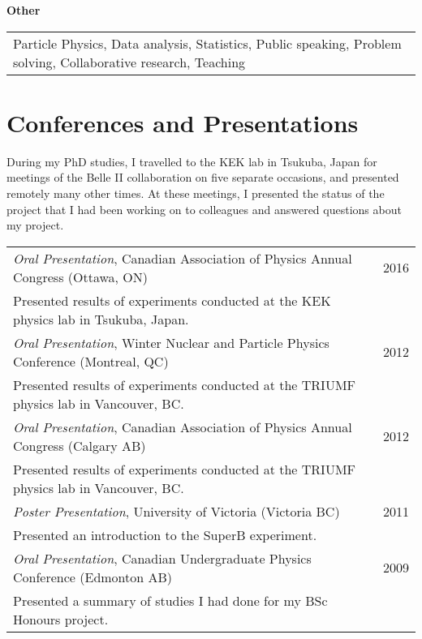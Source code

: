 \documentclass{article}
\begin{document}
\textbf{Other}\\
\begin{tabular}{l}
 Particle Physics, Data analysis, Statistics, Public speaking, Problem solving, Collaborative research, Teaching\\	
\end{tabular}
	
\section{Conferences and Presentations}

During my PhD studies, I travelled to the KEK lab in Tsukuba, Japan for meetings of the Belle II collaboration on five separate occasions, and presented remotely many other times. At these meetings, I presented the status of the project that I had been working on to colleagues and answered questions about my project.



\begin{tabular}{p{14cm}l}
 \textit{Oral Presentation}, Canadian Association of Physics Annual Congress (Ottawa, ON) & 2016\\ \footnotesize{Presented results of experiments conducted at the KEK physics lab in Tsukuba, Japan.} &\smallskip\\

 \textit{Oral Presentation}, Winter Nuclear and Particle Physics Conference (Montreal, QC) & 2012\\ \footnotesize{Presented results of experiments conducted at the TRIUMF physics lab in Vancouver, BC.} & \smallskip\\

 \textit{Oral Presentation}, Canadian Association of Physics Annual Congress (Calgary AB)& 2012\\ \footnotesize{Presented results of experiments conducted at the TRIUMF physics lab in Vancouver, BC.} & \smallskip\\

\textit{Poster Presentation}, University of Victoria (Victoria BC) & 2011 \\ \footnotesize{Presented an introduction to the SuperB experiment.} &\smallskip \\

 \textit{Oral Presentation}, Canadian Undergraduate Physics Conference (Edmonton AB)& 2009\\ \footnotesize{Presented a summary of studies I had done for my BSc Honours project.} & \smallskip\\
\end{tabular}
\end{document}
